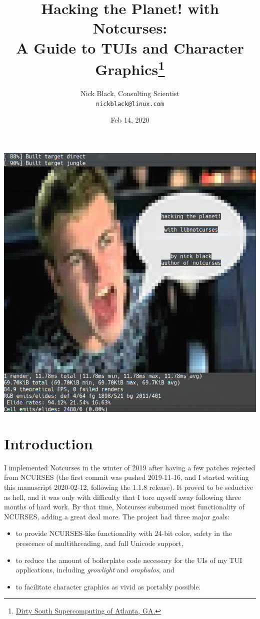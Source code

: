 \documentclass[letterpaper,10pt]{article}
\title{Hacking the Planet! with Notcurses:\\
A Guide to TUIs and Character Graphics\thanks{
 \href{https://www.dsscaw.com/}{Dirty South Supercomputing of Atlanta, GA.}
}\\
}
\author{Nick Black, Consulting Scientist\\
\texttt{nickblack@linux.com}
}
\newenvironment{denseitemize}{
  \begin{itemize}
      \setlength{\itemsep}{0pt}
}{
  \end{itemize}
}
\begin{document}
\date{Feb 14, 2020}
\maketitle
\thispagestyle{fancy}
\date{}
\vspace{1in}
\begin{center}
\includegraphics[width=.75\linewidth]{htp-with-notcurses.png}
\end{center}

\clearpage

\tableofcontents

\section{Introduction}

I implemented Notcurses in the winter of 2019 after having a few patches
rejected from NCURSES (the first commit was pushed 2019-11-16, and I started
writing this manuscript 2020-02-12, following the 1.1.8 release). It proved to
be seductive as hell, and it was only with difficulty that I tore myself away
following three months of hard work. By that time, Notcurses subsumed most
functionality of NCURSES, adding a great deal more. The project had three
major goals:

\begin{denseitemize}
\item  to provide NCURSES-like functionality with 24-bit color, safety in the
    prescence of multithreading, and full Unicode support,
\item to reduce the amount of boilerplate code necessary for the UIs of my
    TUI applications, including \textit{growlight} and \textit{omphalos}, and
\item to facilitate character graphics as vivid as portably possible.
\end{denseitemize}
\end{document}
